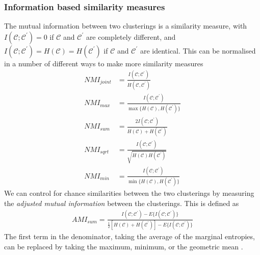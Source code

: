       \subsubsection{Information based similarity measures}\label{sec:information_similarity_measures}
      The mutual information between two clusterings is a similarity measure, with $I(\mathcal{C};\mathcal{C}^{\prime}) = 0$ if $\mathcal{C}$ and $\mathcal{C}^{\prime}$ are completely different, and $I(\mathcal{C};\mathcal{C}^{\prime}) = H(\mathcal{C}) = H(\mathcal{C}^{\prime})$ if $\mathcal{C}$ and $\mathcal{C}^{\prime}$ are identical. This can be normalised in a number of different ways to make more similarity measures  \parencite{vinh}
      \begin{align}
          NMI_{joint} &= \frac{I(\mathcal{C};\mathcal{C}^{\prime})}{H(\mathcal{C}, \mathcal{C}^{\prime})} \\
          NMI_{max} &= \frac{I(\mathcal{C};\mathcal{C}^{\prime})}{\max \lbrace H(\mathcal{C}), H(\mathcal{C}^{\prime}) \rbrace} \\
          NMI_{sum} &= \frac{2I(\mathcal{C};\mathcal{C}^{\prime})}{H(\mathcal{C}) + H(\mathcal{C}^{\prime}) } \\
          NMI_{sqrt} &= \frac{I(\mathcal{C};\mathcal{C}^{\prime})}{\sqrt{H(\mathcal{C}) H(\mathcal{C}^{\prime}) }} \\
          NMI_{min} &= \frac{I(\mathcal{C};\mathcal{C}^{\prime})}{\min \lbrace H(\mathcal{C}), H(\mathcal{C}^{\prime}) \rbrace}
      \end{align}
      We can control for chance similarities between the two clusterings by measuring the \textit{adjusted mutual information} between the clusterings. This is defined as
      \begin{align}
        AMI_{sum} = \frac{I(\mathcal{C};\mathcal{C}^{\prime}) - E \lbrace I(\mathcal{C};\mathcal{C}^{\prime}) \rbrace}{\frac{1}{2}\left[ H(\mathcal{C}) + H(\mathcal{C}^{\prime})\right] - E \lbrace I(\mathcal{C};\mathcal{C}^{\prime})  \rbrace}
      \end{align}
      The first term in the denominator, taking the average of the marginal entropies, can be replaced by taking the maximum, minimum, or the geometric mean  \parencite{vinh}.

